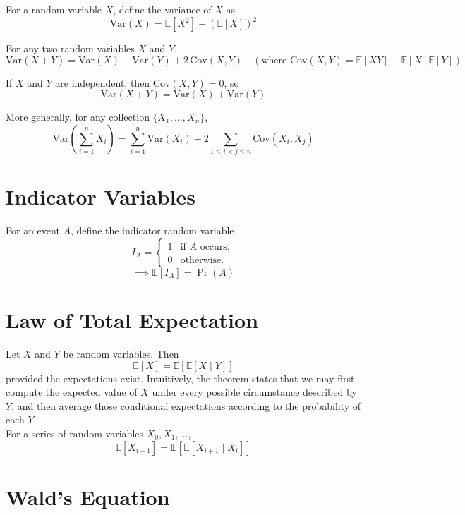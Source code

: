 \noindent For a random variable $X$, define the variance of $X$ as
\[
\mathrm{Var}(X)=\mathbb{E}[X^2]-\left(\mathbb{E}[X]\right)^2
\]

\vspace{1.5em}

\noindent For any two random variables $X$ and $Y$,
\[
\mathrm{Var}(X+Y)=\mathrm{Var}(X)+\mathrm{Var}(Y)+2\,\mathrm{Cov}(X,Y) \hspace{1em}(\text{where }
\mathrm{Cov}(X,Y)=\mathbb{E}[XY]-\mathbb{E}[X]\mathbb{E}[Y])
\]

\noindent If $X$ and $Y$ are independent, then $\mathrm{Cov}(X,Y)=0$, so
\[
\mathrm{Var}(X+Y)=\mathrm{Var}(X)+\mathrm{Var}(Y)
\]

\noindent More generally, for any collection $\{X_1,\dots,X_n\}$,
\[
\mathrm{Var}\left(\sum_{i=1}^n X_i\right)
=
\sum_{i=1}^n \mathrm{Var}(X_i)
+
2\sum_{1\le i<j\le n}\mathrm{Cov}(X_i,X_j)
\]

\section{Indicator Variables}
\label{indicator_variables}
\noindent For an event $A$, define the indicator random variable
\[
I_A=
\begin{cases}
1 & \text{if } A \text{ occurs},\\
0 & \text{otherwise}.
\end{cases}
\]
\vspace{0.3em}
\[
\implies
\mathbb{E}[I_A]=\Pr(A)
\]

\section{Law of Total Expectation}
\label{total_expectation}
Let \(X\) and \(Y\) be random variables. Then
\[
\mathbb E[X]
=
\mathbb E\!\left[\mathbb E[X\mid Y]\right]
\]
provided the expectations exist. Intuitively, the theorem states that 
we may first compute the expected value of \(X\) under every possible circumstance described by \(Y\), 
and then average those conditional expectations according to the probability of 
each $Y$.\\

\noindent For a series of random variables $X_0,X_1,\dots$,
\[
\mathbb E[X_{i+1}]
=
\mathbb E\!\left[\mathbb E[X_{i+1}\mid X_i]\right]
\]


\section{Wald's Equation}
\label{wald_eq}

